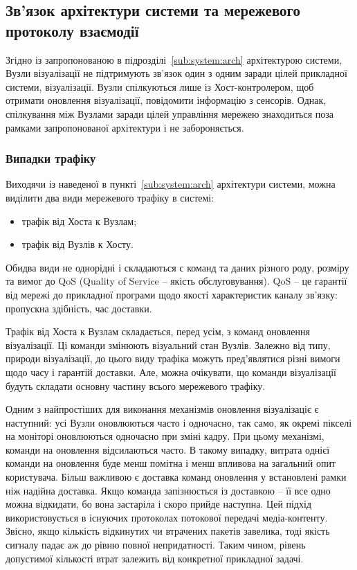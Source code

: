 \documentclass[a4paper,ukrainian,utf8,nocolumnsxix,floatsection]{eskdtext}
\renewcommand\paragraph{\subsubsection}
\begin{document}
\subsection{Зв’язок архітектури системи та мережевого протоколу взаємодії}

Згідно із запропонованою в підрозділі~\ref{sub:system:arch} архітектурою системи, Вузли візуалізації не підтримують зв’язок один з одним заради цілей прикладної системи, візуалізації. Вузли спілкуються лише із Хост-контролером, щоб отримати оновлення візуалізації, повідомити інформацію з сенсорів. Однак, спілкування між Вузлами заради цілей управління мережею знаходиться поза рамками запропонованої архітектури і не забороняється.

\paragraph{Випадки трафіку}
\label{par:traffic:cases}

Виходячи із наведеної в пункті~\ref{sub:system:arch} архітектури системи, можна виділити два види мережевого трафіку в системі:
\begin{itemize}
	\item трафік від Хоста к Вузлам;
	\item трафік від Вузлів к Хосту.
\end{itemize}

Обидва види не однорідні і складаються с команд та даних різного роду, розміру та вимог до QoS (Quality of Service – якість обслуговування). QoS – це гарантії від мережі до прикладної програми щодо якості характеристик каналу зв’язку: пропускна здібність, час доставки.

Трафік від Хоста к Вузлам складається, перед усім, з команд оновлення візуалізації. Ці команди змінюють візуальний стан Вузлів. Залежно від типу, природи візуалізації, до цього виду трафіка можуть пред’являтися різні вимоги щодо часу і гарантій доставки. Але, можна очікувати, що команди візуалізації будуть складати основну частину всього мережевого трафіку.

Одним з найпростіших для виконання механізмів оновлення візуалізаціє є наступний: усі Вузли оновлюються часто і одночасно, так само, як окремі пікселі на моніторі оновлюються одночасно при зміні кадру. При цьому механізмі, команди на оновлення відсилаються часто. В такому випадку, витрата однієї команди на оновлення буде менш помітна і менш впливова на загальний опит користувача. Більш важливою є доставка  команд оновлення у встановлені рамки ніж надійна доставка. Якщо команда запізнюється із доставкою – її все одно можна відкидати, бо вона застаріла і скоро прийде наступна. Цей підхід використовується в існуючих протоколах потокової передачі медіа-контенту. Звісно, якщо кількість відкинутих чи втрачених пакетів завелика, тоді якість сигналу падає аж до рівню повної непридатності. Таким чином, рівень допустимої кількості втрат залежить від конкретної прикладної задачі.
\end{document}
